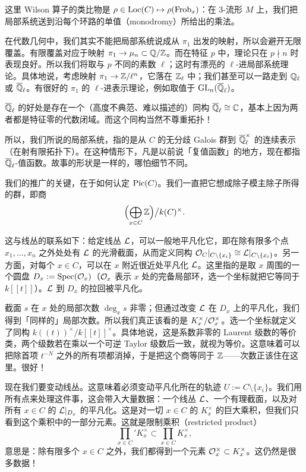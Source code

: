 这里 Wilson 算子的类比物是 $\rho\in\mathrm{Loc}(C)\mapsto\rho(\operatorname{Frob}_x)$：在 3-流形 $M$ 上，我们把局部系统送到沿每个环路的单值（monodromy）所给出的乘法。

在代数几何中，我们其实不能把局部系统说成从 $\pi_1$ 出发的映射，所以会避开无限覆盖。有限覆盖对应于映射 $\pi_1\to\mu_n\subset\mathbb{Q}/\mathbb{Z}$。而在特征 $p$ 中，理论只在 $p\nmid n$ 时表现良好。所以我们将取与 $p$ 不同的素数 $\ell$；这时有漂亮的 $\ell$-进局部系统理论。具体地说，考虑映射 $\pi_1\to\mathbb{Z}/\ell^n$，它落在 $\mathbb{Z}_\ell$ 中；我们甚至可以一路走到 $\mathbb{Q}_\ell$ 或 $\overline{\mathbb{Q}}_\ell$。有很好的 $\pi_1$ 的 $\ell$-进表示理论，例如取值于 $\mathrm{GL}_n(\overline{\mathbb{Q}}_\ell)$。

$\overline{\mathbb{Q}}_\ell$ 的好处是存在一个（高度不典范、难以描述的）同构 $\overline{\mathbb{Q}}_\ell\cong\mathbb{C}$，基本上因为两者都是特征零的代数闭域。而这个同构当然不尊重拓扑！

所以，我们所说的局部系统，指的是从 $C$ 的无分歧 Galois 群到 $\overline{\mathbb{Q}}_\ell^\times$ 的连续表示（在射有限拓扑下）。在这种情形下，凡是以前说「复值函数」的地方，现在都指 $\overline{\mathbb{Q}}_\ell$-值函数。故事的形状是一样的，哪怕细节不同。

我们的推广的关键，在于如何认定 $\operatorname{Pic}(C)$。我们一直把它想成除子模主除子所得的群，即商
\[
  \Bigl(\bigoplus_{x\in C}\mathbb{Z}\Bigr)\big/k(C)^\times.
\]

这与线丛的联系如下：给定线丛 $\mathcal{L}$，可以一般地平凡化它，即在除有限多个点 $x_1,\dots,x_n$ 之外处处有 $\mathcal{L}$ 的光滑截面，从而定义同构 $\mathcal{O}_C|_{C\setminus\{x_i\}}\cong\mathcal{L}|_{C\setminus\{x_i\}}$。另一方面，对每个 $x\in C$，可以在 $x$ 附近很近处平凡化 $\mathcal{L}$。这里指的是取 $x$ 周围的一个圆盘 $D_x:=\operatorname{Spec}(\mathcal{O}_x)$（$\mathcal{O}_x$ 表示 $x$ 处的完备局部环，选一个坐标就把它等同于 $k[[t]]$）。$\mathcal{L}$ 到 $D_x$ 的拉回被平凡化。


截面 $s$ 在 $x$ 处的局部次数 $\deg_x s$ 非零；但通过改变 $\mathcal{L}$ 在 $D_x$ 上的平凡化，我们得到「同样的」局部次数。所以我们真正该看的是 $K_x^\times/\mathcal{O}_x^\times$。选一个坐标就定义了同构 $k((t))^\times/k[[t]]^\times$。具体地说，这是系数非零的 Laurent 级数的等价类，两个级数若在乘以一个可逆 Taylor 级数后一致，就视为等价。这意味着可以把除首项 $t^{-N}$ 之外的所有项都消掉，于是把这个商等同于 $\mathbb{Z}$——次数正该住在这里。很好！

现在我们要变动线丛。这意味着必须变动平凡化所在的轨迹 $U:=C\setminus\{x_i\}$。我们用所有点来处理这件事，这会带入大量数据：一个线丛 $\mathcal{L}$、一个有理截面，以及对所有 $x\in C$ 的 $\mathcal{L}|_{D_x}$ 的平凡化。这是对一切 $x\in C$ 的 $K_x^\times$ 的巨大乘积，但我们只看到这个乘积中的一部分元素。这就是限制乘积（restricted product）
\[
  {\prod_{x\in C}}' K_x^\times \subset \prod_{x\in C} K_x^\times,
\]
意思是：除有限多个 $x\in C$ 之外，我们都得到一个元素 $\mathcal{O}_x^\times\subset K_x^\times$。这仍然是很多数据！

